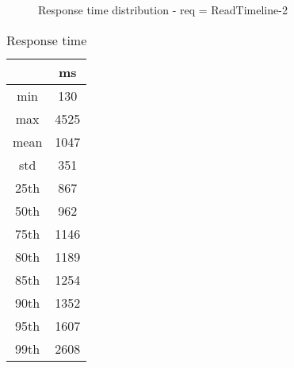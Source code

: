 \begin{minipage}{0.75\linewidth}
\begin{figure}[h]
\begin{adjustbox}{max width=1.0\linewidth, keepaspectratio}
  \end{adjustbox}
  \caption{Response time distribution - req = ReadTimeline-2}
\end{figure}
\end{minipage}\hfill\begin{minipage}{0.18\linewidth}
\begin{table}[h]
\begin{tabular}{|cc|}
\hline
\textbf{} & \textbf{ms}\\ \hline
 \Xhline{0.005\arrayrulewidth}
min & 130\\
 \Xhline{0.005\arrayrulewidth}
max & 4525\\
 \Xhline{0.005\arrayrulewidth}
mean & 1047\\
 \Xhline{0.005\arrayrulewidth}
std & 351\\
\hline
\hline
 \Xhline{0.005\arrayrulewidth}
25th & 867\\
 \Xhline{0.005\arrayrulewidth}
50th & 962\\
 \Xhline{0.005\arrayrulewidth}
75th & 1146\\
 \Xhline{0.005\arrayrulewidth}
80th & 1189\\
 \Xhline{0.005\arrayrulewidth}
85th & 1254\\
 \Xhline{0.005\arrayrulewidth}
90th & 1352\\
 \Xhline{0.005\arrayrulewidth}
95th & 1607\\
 \Xhline{0.005\arrayrulewidth}
99th & 2608\\
\hline
\end{tabular}
\caption{Response time}
\end{table}
\end{minipage}\hfill